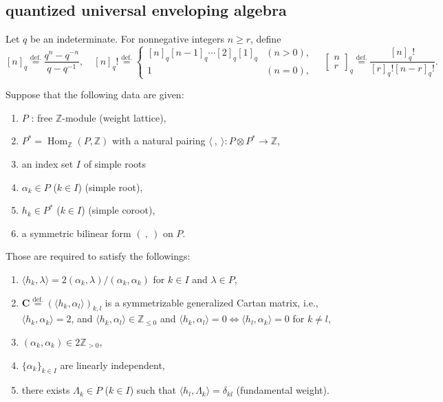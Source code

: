 \documentclass[12pt]{amsart}
\def\Bbb{\mathbb}
\renewcommand{\labelenumi}{(\theenumi)}%
\newenvironment{aenume}{%
  \begin{enumerate}%
  \renewcommand{\theenumi}{\alph{enumi}}%
  \renewcommand{\labelenumi}{(\theenumi)}%
  }{\end{enumerate}}
\theoremstyle{definition}
\theoremstyle{remark}
\numberwithin{equation}{subsection}
\newcommand{\defeq}{\overset{\operatorname{\scriptstyle def.}}{=}}
\newcommand{\Z}{{\Bbb Z}}
\newcommand{\Hom}{\operatorname{Hom}}
\newcommand{\bC}{{\mathbf C}} %
\begin{document}
\subsection{quantized universal enveloping algebra}\label{subsec:QUE}

Let $q$ be an indeterminate. For nonnegative integers $n\ge r$, define 
\begin{equation}\label{eq:q-binom}
  [n]_q \defeq \frac{q^n - q^{-n}}{q - q^{-1}}, \quad
  [n]_q ! \defeq 
  \begin{cases}
   [n]_q [n-1]_q \cdots [2]_q [1]_q &(n > 0),\\
   1 &(n=0),
  \end{cases}
\quad  
  \begin{bmatrix}
    n \\ r
  \end{bmatrix}_q \defeq \frac{[n]_q !}{[r]_q! [n-r]_q!}.
\end{equation}

Suppose that the following data are given:
\begin{enumerate}
  \item $P$ : free $\Z$-module (weight lattice),
  \item $P^* = \Hom_{\Z}(P, \Z)$ with a natural pairing 
    $\langle\ , \ \rangle\colon P\otimes P^*\to \Z$,
    \item an index set $I$ of simple roots
  \item $\alpha_k\in P$ ($k \in I$) (simple root),
  \item $h_k \in P^*$ ($k \in I$) (simple coroot),
  \item a symmetric bilinear form $(\ ,\ )$ on $P$.
\end{enumerate}
Those are required to satisfy the followings:
\begin{aenume}
\item $\langle h_k, \lambda\rangle 
= 2(\alpha_k, \lambda)/(\alpha_k,\alpha_k)$ for  
  $k \in I$ and $\lambda\in P$,
\item $\bC \defeq (\langle h_k, \alpha_l \rangle)_{k,l}$ is a symmetrizable
  generalized Cartan matrix, i.e., $\langle h_k, \alpha_k\rangle = 2$,
  and 
  $\langle h_k, \alpha_l\rangle\in\Z_{\le 0}$ and
  $\langle h_k, \alpha_l\rangle = 0 \Longleftrightarrow
   \langle h_l, \alpha_k\rangle = 0$ for $k\ne l$,
\item $(\alpha_k,\alpha_k)\in 2\Z_{> 0}$,
\item $\{\alpha_k\}_{k\in I}$ are linearly independent,
\item there exists $\Lambda_k\in P$ ($k \in I$) such that 
  $\langle h_l, \Lambda_k\rangle = \delta_{kl}$
  (fundamental weight).
\end{aenume}
\end{document}
